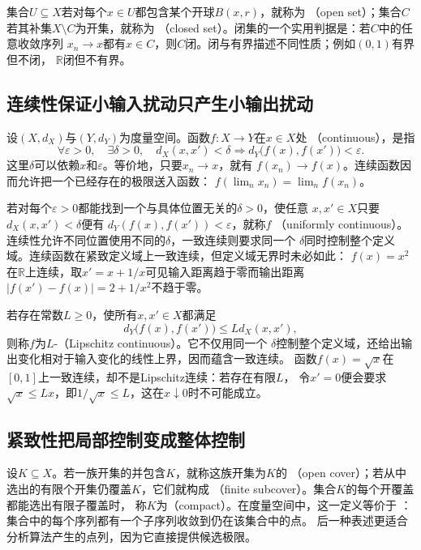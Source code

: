 集合$U\subseteq X$若对每个$x\in U$都包含某个开球$B(x,r)$，就称为
（open set）；集合$C$若其补集$X\setminus C$为开集，就称为
（closed set）。闭集的一个实用判据是：若$C$中的任意收敛序列
$x_n\to x$都有$x\in C$，则$C$闭。闭与有界描述不同性质；例如$(0,1)$有界但不闭，
$\mathbb{R}$闭但不有界。
\subsection{连续性保证小输入扰动只产生小输出扰动}

设$(X,d_X)$与$(Y,d_Y)$为度量空间。函数$f:X\to Y$在$x\in X$处
（continuous），是指
\[   \forall\varepsilon>0,\quad   \exists\delta>0,\quad   d_X(x,x')<\delta   \Longrightarrow   d_Y\bigl(f(x),f(x')\bigr)<\varepsilon. \]
这里$\delta$可以依赖$x$和$\varepsilon$。等价地，只要$x_n\to x$，就有 $f(x_n)\to f(x)$。连续函数因而允许把一个已经存在的极限送入函数： $f(\lim_n x_n)=\lim_n f(x_n)$。

若对每个$\varepsilon>0$都能找到一个与具体位置无关的$\delta>0$，使任意
$x,x'\in X$只要$d_X(x,x')<\delta$便有
$d_Y(f(x),f(x'))<\varepsilon$，就称$f$
（uniformly continuous）。连续性允许不同位置使用不同的$\delta$，一致连续则要求同一个
$\delta$同时控制整个定义域。连续函数在紧致定义域上一致连续，但定义域无界时未必如此：
$f(x)=x^2$在$\mathbb{R}$上连续，取$x'=x+1/x$可见输入距离趋于零而输出距离
$|f(x')-f(x)|=2+1/x^2$不趋于零。

若存在常数$L\geq0$，使所有$x,x'\in X$都满足
\begin{equation}
  d_Y\bigl(f(x),f(x')\bigr)\leq Ld_X(x,x'),
\label{eq:analysis-lipschitz-condition}
\end{equation}
则称$f$为$L$-（Lipschitz continuous）。它不仅用同一个
$\delta$控制整个定义域，还给出输出变化相对于输入变化的线性上界，因而蕴含一致连续。
函数$f(x)=\sqrt{x}$在$[0,1]$上一致连续，却不是Lipschitz连续：若存在有限$L$，
令$x'=0$便会要求$\sqrt{x}\leq Lx$，即$1/\sqrt{x}\leq L$，这在$x\downarrow0$时不可能成立。
\subsection{紧致性把局部控制变成整体控制}

设$K\subseteq X$。若一族开集的并包含$K$，就称这族开集为$K$的
（open cover）；若从中选出的有限个开集仍覆盖$K$，它们就构成
（finite subcover）。集合$K$的每个开覆盖都能选出有限子覆盖时，
称$K$为（compact）。在度量空间中，这一定义等价于
：集合中的每个序列都有一个子序列收敛到仍在该集合中的点。
后一种表述更适合分析算法产生的点列，因为它直接提供候选极限。

